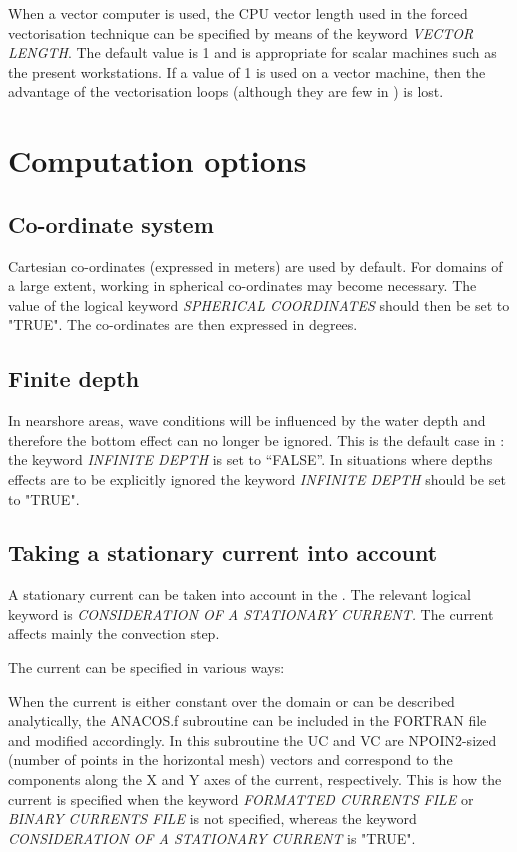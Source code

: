  When a vector computer is used, the CPU vector length used in the forced vectorisation technique can be specified by means of the keyword \textit{VECTOR LENGTH}. The default value is 1 and is appropriate for scalar machines such as the present workstations. If a value of 1 is used on a vector machine, then the advantage of the vectorisation loops (although they are few in \tomawac) is lost.


\section{ Computation options}


\subsection{ Co-ordinate system}

 Cartesian co-ordinates (expressed in meters) are used by default. For domains of a large extent, working in spherical co-ordinates may become necessary. The value of the logical keyword \textit{SPHERICAL COORDINATES} should then be set to "TRUE". The co-ordinates are then expressed in degrees.


\subsection{ Finite depth }

 In nearshore areas, wave conditions will be influenced by the water depth and therefore the bottom effect can no longer be ignored. This is the default case in \tomawac: the keyword \textit{INFINITE DEPTH }is set to ``FALSE''. In situations where depths effects are to be explicitly ignored the keyword \textit{INFINITE DEPTH} should be set to "TRUE".


\subsection{ Taking a stationary current into account}
\label{se:current}
 A stationary current can be taken into account in the \tomawac. The relevant logical keyword is \textit{CONSIDERATION OF A STATIONARY CURRENT. }The current affects mainly the convection step.

 The current can be specified in various ways:

 When the current is either constant over the domain or can be described analytically, the ANACOS.f subroutine can be included in the FORTRAN file and modified accordingly. In this subroutine the UC and VC are NPOIN2-sized (number of points in the horizontal mesh) vectors and correspond to the components along the X and Y axes of the current, respectively. This is how the current is specified when the keyword \textit{FORMATTED CURRENTS FILE} or \textit{BINARY CURRENTS FILE }is not specified, whereas the keyword \textit{CONSIDERATION OF A STATIONARY CURRENT} is "TRUE".

